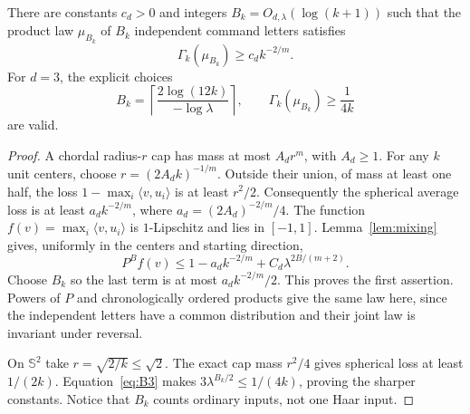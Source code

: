 \begin{lemma}\label{lem:finite-distortion}
There are constants $c_d>0$ and integers $B_k=O_{d,\lambda}(\log(k+1))$
such that the product law $\mu_{B_k}$ of $B_k$ independent command letters
satisfies
\begin{equation}\label{eq:finite-distortion}
 \Gamma_k(\mu_{B_k})\ge c_d k^{-2/m}.
\end{equation}
For $d=3$, the explicit choices
\begin{equation}\label{eq:B3}
 B_k=\left\lceil\frac{2\log(12k)}{-\log\lambda}\right\rceil,
 \qquad \Gamma_k(\mu_{B_k})\ge\frac1{4k}
\end{equation}
are valid.
\end{lemma}
\begin{proof}
A chordal radius-$r$ cap has mass at most $A_dr^m$, with $A_d\ge1$.
For any $k$ unit centers, choose $r=(2A_dk)^{-1/m}$. Outside their
union, of mass at least one half, the loss
$1-\max_i\langle v,u_i\rangle$ is at least $r^2/2$.
Consequently the spherical average loss is at least
$a_dk^{-2/m}$, where $a_d=(2A_d)^{-2/m}/4$.
The function $f(v)=\max_i\langle v,u_i\rangle$ is $1$-Lipschitz
and lies in $[-1,1]$. Lemma~\ref{lem:mixing} gives, uniformly in the
centers and starting direction,
\[
 P^Bf(v)\le1-a_d k^{-2/m}+C_d\lambda^{2B/(m+2)}.
\]
Choose $B_k$ so the last term is at most $a_dk^{-2/m}/2$.
This proves the first assertion. Powers of $P$ and chronologically
ordered products give the same law here, since the independent letters
have a common distribution and their joint law is invariant under
reversal.

On $\mathbb S^2$ take $r=\sqrt{2/k}\le\sqrt2$. The exact cap mass
$r^2/4$ gives spherical loss at least $1/(2k)$. Equation~\eqref{eq:B3}
makes $3\lambda^{B_k/2}\le1/(4k)$, proving the sharper constants.
Notice that $B_k$ counts ordinary inputs, not one Haar input.
\end{proof}

